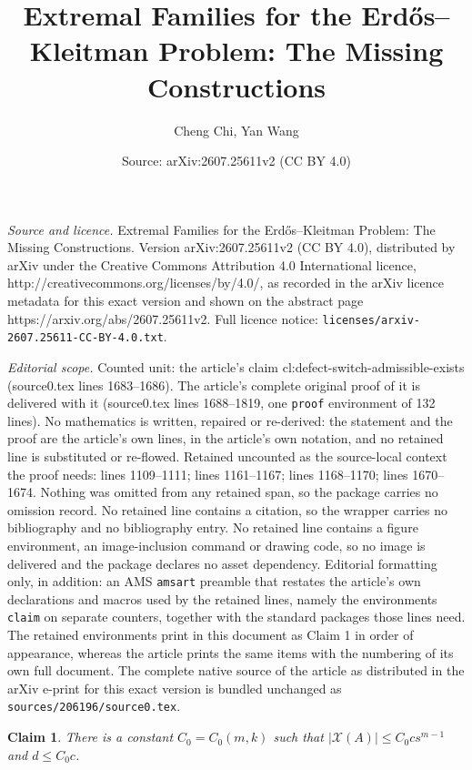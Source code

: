 \documentclass[10pt,a4paper]{amsart}
\title{Extremal Families for the Erd\H{o}s--Kleitman Problem: The Missing Constructions}
\author{Cheng Chi, Yan Wang}
\date{Source: arXiv:2607.25611v2 (CC BY 4.0)}
\newtheorem{claim}{Claim}
\newcommand{\X}{\mathcal X}
\begin{document}
\maketitle

\noindent\emph{Source and licence.} Extremal Families for the Erd\H{o}s--Kleitman Problem: The Missing Constructions. Version arXiv:2607.25611v2 (CC BY 4.0), distributed by arXiv under the Creative Commons Attribution 4.0 International licence, http://creativecommons.org/licenses/by/4.0/, as recorded in the arXiv licence metadata for this exact version and shown on the abstract page https://arxiv.org/abs/2607.25611v2. Full licence notice: \texttt{licenses/arxiv-2607.25611-CC-BY-4.0.txt}.\par\smallskip

\noindent\textit{Editorial scope.} Counted unit: the article's claim cl:defect-switch-admissible-exists (source0.tex lines 1683--1686). The article's complete original proof of it is delivered with it (source0.tex lines 1688--1819, one \texttt{proof} environment of 132 lines). No mathematics is written, repaired or re-derived: the statement and the proof are the article's own lines, in the article's own notation, and no retained line is substituted or re-flowed.  Retained uncounted as the source-local context the proof needs: lines 1109--1111; lines 1161--1167; lines 1168--1170; lines 1670--1674.  Nothing was omitted from any retained span, so the package carries no omission record.  No retained line contains a citation, so the wrapper carries no bibliography and no bibliography entry.  No retained line contains a figure environment, an image-inclusion command or drawing code, so no image is delivered and the package declares no asset dependency.  Editorial formatting only, in addition: an AMS \texttt{amsart} preamble that restates the article's own declarations and macros used by the retained lines, namely the environments \texttt{claim} on separate counters, together with the standard packages those lines need.  The retained environments print in this document as Claim 1 in order of appearance, whereas the article prints the same items with the numbering of its own full document.  The complete native source of the article as distributed in the arXiv e-print for this exact version is bundled unchanged as \texttt{sources/206196/source0.tex}.
\begin{claim}\label{cl:defect-coarse-bounds}
        There is a constant $C_0=C_0(m,k)$ such that $|\X(A)|\le C_0cs^{m-1}$ and $d\le C_0c$.
\end{claim}
\end{document}
